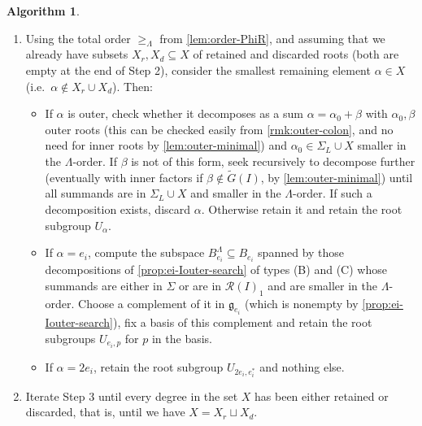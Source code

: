 \documentclass[11pt,letterpaper,reqno]{amsart}
\theoremstyle{remark}
\theoremstyle{definition}
\newtheorem{algorithm}[algorithm]{Algorithm}
\begin{document}
\begin{algorithm}
\begin{enumerate}
\item[\textup{Step~3.}] Using the total order $\geq_\Lambda$ from \cref{lem:order-PhiR}, and assuming that we already have subsets $X_r,X_d\subseteq X$ of retained and discarded roots (both are empty at the end of Step 2), consider the smallest remaining element $\alpha\in X$ (i.e.~$\alpha\not\in X_r\cup X_d$). Then:
\begin{itemize}
    \item If $\alpha$ is outer, check whether it decomposes as a sum $\alpha=\alpha_0+\beta$ with $\alpha_0,\beta$ outer roots (this can be checked easily from \cref{rmk:outer-colon}, and no need for inner roots by \cref{lem:outer-minimal}) and $\alpha_0\in \Sigma_L\cup X$ smaller in the $\Lambda$-order. If $\beta$ is not of this form, seek recursively to decompose further (eventually with inner factors if $\beta\not\in\widetilde G(I)$, by \cref{lem:outer-minimal}) until all summands are in $\Sigma_L\cup X$ and smaller in the $\Lambda$-order. If such a decomposition exists, discard $\alpha$. Otherwise retain it and retain the root subgroup $U_\alpha$.
    \item If $\alpha=e_i$, compute the subspace $B^{\Lambda}_{e_i}\subseteq B_{e_i}$ spanned by those decompositions of \cref{prop:ei-Iouter-search} of types \textup{(B)} and \textup{(C)} whose summands are either in $\Sigma$ or are in $\mathcal R(I)_1$ and are smaller in the $\Lambda$-order.
    Choose a complement of it in $\mathfrak g_{e_{i}}$ (which is nonempty by \cref{prop:ei-Iouter-search}), fix a basis of this complement and retain the root subgroups $U_{e_i,p}$ for $p$ in the basis.
    \item If $\alpha=2e_i$, retain the root subgroup $U_{2e_i,e_i^*}$ and nothing else.
\end{itemize}

\item[\textup{Step~4.}] Iterate Step 3 until every degree in the set $X$ has been either retained or discarded, that is, until we have $X=X_r\sqcup X_d$.
\end{enumerate}
\end{algorithm}
\end{document}
